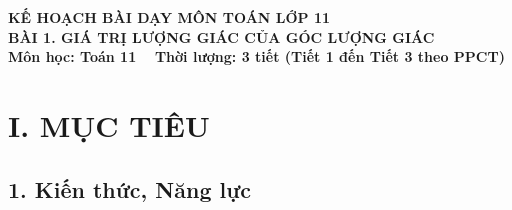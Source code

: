 \documentclass[12pt, a4paper]{article}
\begin{document}
\begin{center}
    {\fontsize{14pt}{17pt}\selectfont \textbf{KẾ HOẠCH BÀI DẠY MÔN TOÁN LỚP 11}}\\[6pt]
    {\fontsize{16pt}{19pt}\selectfont \textbf{BÀI 1. GIÁ TRỊ LƯỢNG GIÁC CỦA GÓC LƯỢNG GIÁC}}\\[4pt]
    {\fontsize{12pt}{15pt}\selectfont \textbf{Môn học: Toán 11} \ \textbar \ \textbf{Thời lượng: 3 tiết (Tiết 1 đến Tiết 3 theo PPCT)}}
\end{center}

\vspace{5pt}

\section*{I. MỤC TIÊU}

\subsection*{1. Kiến thức, Năng lực}
\end{document}
